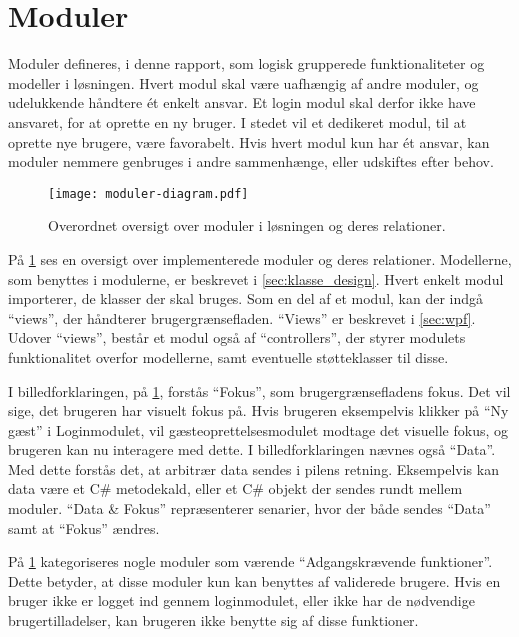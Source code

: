 \section{Moduler}
\label{sec:moduler}

Moduler defineres, i denne rapport, som logisk grupperede funktionaliteter og modeller i løsningen. Hvert modul skal være uafhængig af andre moduler, og udelukkende håndtere ét enkelt ansvar. Et login modul skal derfor ikke have ansvaret, for at oprette en ny bruger. I stedet vil et dedikeret modul, til at oprette nye brugere, være favorabelt. Hvis hvert modul kun har ét ansvar, kan moduler nemmere genbruges i andre sammenhænge, eller udskiftes efter behov.

\begin{figure}
  \centering
  \texttt{[image: moduler-diagram.pdf]}
  \caption{Overordnet oversigt over moduler i løsningen og deres relationer.}
  \label{fig:mod}
\end{figure}

På \cref{fig:mod} ses en oversigt over implementerede moduler og deres relationer. Modellerne, som benyttes i modulerne, er beskrevet i \cref{sec:klasse_design}. Hvert enkelt modul importerer, de klasser der skal bruges. Som en del af et modul, kan der indgå \enquote{views}, der håndterer brugergrænsefladen. \enquote{Views} er beskrevet i \cref{sec:wpf}. Udover \enquote{views}, består et modul også af \enquote{controllers}, der styrer modulets funktionalitet overfor modellerne, samt eventuelle støtteklasser til disse.

I billedforklaringen, på \cref{fig:mod}, forstås \enquote{Fokus}, som brugergrænsefladens fokus. Det vil sige, det brugeren har visuelt fokus på. Hvis brugeren eksempelvis klikker på \enquote{Ny gæst} i Loginmodulet, vil gæsteoprettelsesmodulet modtage det visuelle fokus, og brugeren kan nu interagere med dette. I billedforklaringen nævnes også \enquote{Data}. Med dette forstås det, at arbitrær data sendes i pilens retning. Eksempelvis kan data være et C\# metodekald, eller et C\# objekt der sendes rundt mellem moduler. \enquote{Data \& Fokus} repræsenterer senarier, hvor der både sendes \enquote{Data} samt at \enquote{Fokus} ændres.

På \cref{fig:mod} kategoriseres nogle moduler som værende \enquote{Adgangskrævende funktioner}. Dette betyder, at disse moduler kun kan benyttes af validerede brugere. Hvis en bruger ikke er logget ind gennem loginmodulet,  eller ikke har de nødvendige brugertilladelser, kan brugeren ikke benytte sig af disse funktioner.

